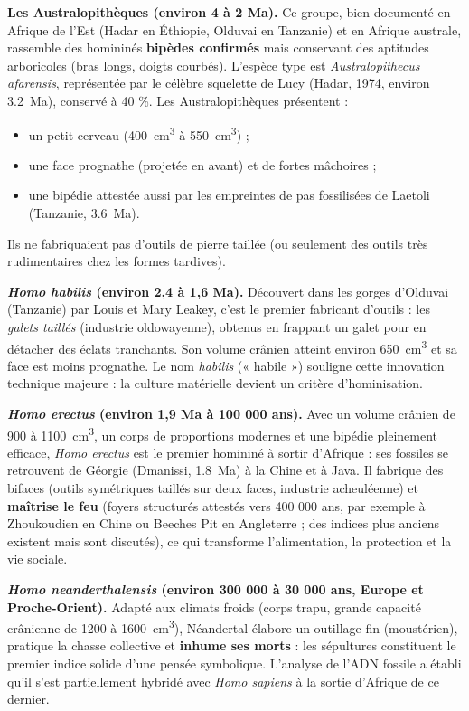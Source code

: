 \documentclass[11pt]{article}
\newcommand{\cle}[1]{{\popxbold\color{popdark}#1}}
\newcounter{popsec}
\newcounter{popsub}
\newcommand{\courssub}[1]{%
  \stepcounter{popsub}%
  \par\vspace{9pt}\noindent{\popxbold\fontsize{11.5}{13}\selectfont\color{popink}{\color{poporange}\thepopsec.\thepopsub}\hspace{6pt}#1}\par\nopagebreak\vspace{4pt}
}
\begin{document}
\textbf{Les Australopithèques (environ 4 à 2 Ma).} Ce groupe, bien documenté en Afrique de l'Est (Hadar en Éthiopie, Olduvai en Tanzanie) et en Afrique australe, rassemble des homininés \textbf{bipèdes confirmés} mais conservant des aptitudes arboricoles (bras longs, doigts courbés). L'espèce type est \emph{Australopithecus afarensis}, représentée par le célèbre squelette de \cle{Lucy} (Hadar, 1974, environ \SI{3,2}{Ma}), conservé à 40 \%. Les Australopithèques présentent :
\begin{itemize}
\item un petit cerveau (\SI{400}{cm^3} à \SI{550}{cm^3}) ;
\item une face \cle{prognathe} (projetée en avant) et de fortes mâchoires ;
\item une bipédie attestée aussi par les empreintes de pas fossilisées de Laetoli (Tanzanie, \SI{3,6}{Ma}).
\end{itemize}
Ils ne fabriquaient pas d'outils de pierre taillée (ou seulement des outils très rudimentaires chez les formes tardives).

\courssub{Le genre \emph{Homo} : outils, feu et conquête du monde}

\textbf{\emph{Homo habilis} (environ 2,4 à 1,6 Ma).} Découvert dans les gorges d'Olduvai (Tanzanie) par Louis et Mary Leakey, c'est le \cle{premier fabricant d'outils} : les \emph{galets taillés} (industrie oldowayenne), obtenus en frappant un galet pour en détacher des éclats tranchants. Son volume crânien atteint environ \SI{650}{cm^3} et sa face est moins prognathe. Le nom \emph{habilis} (« habile ») souligne cette innovation technique majeure : la culture matérielle devient un critère d'hominisation.

\textbf{\emph{Homo erectus} (environ 1,9 Ma à 100 000 ans).} Avec un volume crânien de \SI{900}{} à \SI{1100}{cm^3}, un corps de proportions modernes et une bipédie pleinement efficace, \emph{Homo erectus} est le \cle{premier homininé à sortir d'Afrique} : ses fossiles se retrouvent de Géorgie (Dmanissi, \SI{1,8}{Ma}) à la Chine et à Java. Il fabrique des \cle{bifaces} (outils symétriques taillés sur deux faces, industrie acheuléenne) et \textbf{maîtrise le feu} (foyers structurés attestés vers 400 000 ans, par exemple à Zhoukoudien en Chine ou Beeches Pit en Angleterre ; des indices plus anciens existent mais sont discutés), ce qui transforme l'alimentation, la protection et la vie sociale.

\textbf{\emph{Homo neanderthalensis} (environ 300 000 à 30 000 ans, Europe et Proche-Orient).} Adapté aux climats froids (corps trapu, grande capacité crânienne de \SI{1200}{} à \SI{1600}{cm^3}), Néandertal élabore un outillage fin (moustérien), pratique la chasse collective et \textbf{inhume ses morts} : les sépultures constituent le premier indice solide d'une pensée symbolique. L'analyse de l'\cle{ADN fossile} a établi qu'il s'est partiellement hybridé avec \emph{Homo sapiens} à la sortie d'Afrique de ce dernier.
\end{document}
